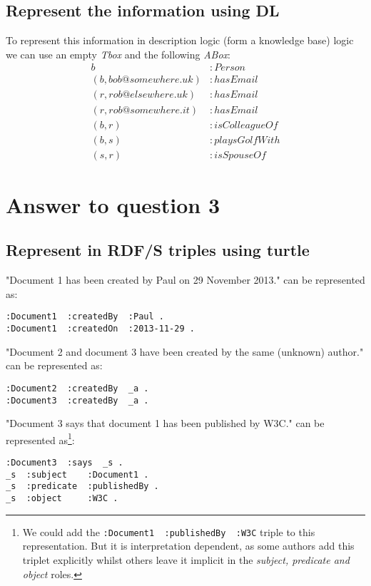 \documentclass[a4paper,12pt]{article}
\begin{document}
\subsection[DL]{Represent the information using DL}
To represent this information in description logic (form a knowledge base)
logic we can use an empty \emph{Tbox} and the following \emph{ABox}:
\begin{align*}
                    b &: Person\\
(b, bob@somewhere.uk) &: hasEmail\\
(r, rob@elsewhere.uk) &: hasEmail\\
(r, rob@somewhere.it) &: hasEmail\\
               (b, r) &: isColleagueOf\\
               (b, s) &: playsGolfWith\\
               (s, r) &: isSpouseOf
\end{align*}

\section[Question 3]{Answer to question 3}

\subsection[Turtle]{Represent in RDF/S triples using turtle}
"Document 1 has been created by Paul on 29 November 2013." can be represented
as:
\begin{Verbatim}[samepage=true]
:Document1  :createdBy  :Paul .
:Document1  :createdOn  :2013-11-29 .
\end{Verbatim}

"Document 2 and document 3 have been created by the same (unknown) author." can
be represented as:
\begin{Verbatim}[samepage=true]
:Document2  :createdBy  _a .
:Document3  :createdBy  _a .
\end{Verbatim}

"Document 3 says that document 1 has been published by W3C." can be represented
as\footnote{We could add the \verb|:Document1  :publishedBy  :W3C| triple to
this representation.  But it is interpretation dependent, as some authors add
this triplet explicitly whilst others leave it implicit in the \emph{subject,
predicate and object} roles.}:
\begin{Verbatim}[samepage=true]
:Document3  :says  _s .
_s  :subject    :Document1 .
_s  :predicate  :publishedBy .
_s  :object     :W3C .
\end{Verbatim}
\end{document}
